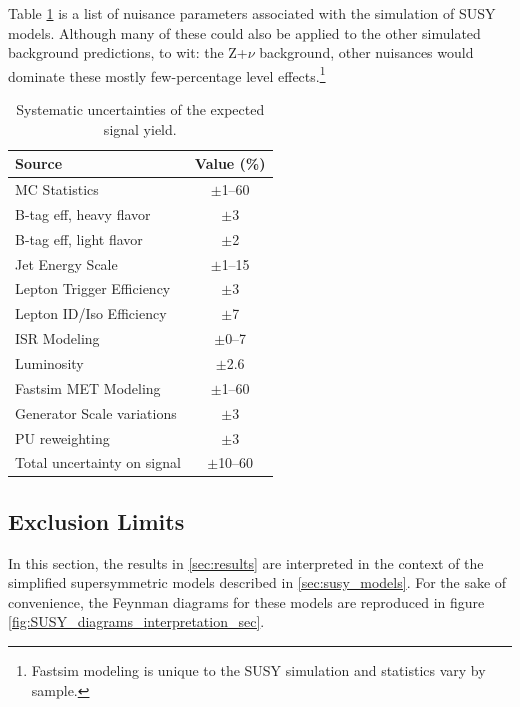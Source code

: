     Table \ref{tab:syst} is a list of nuisance parameters associated with the simulation of SUSY models. Although many of these could also be applied to the other simulated background predictions, to wit: the Z+$\nu$ background, other nuisances would dominate these mostly few-percentage level effects.\footnote{Fastsim \MET modeling is unique to the SUSY simulation and statistics vary by sample.} 

    \begin{table}[htb]
      \begin{center}
        \footnotesize
        \caption{\label{tab:syst} Systematic uncertainties of the expected signal yield. }
        \begin{tabular}{l|c}
          \hline
          \hline
          Source                     & Value (\%) \\
          \hline
          MC Statistics              & $\pm$1--60 \\
          B-tag eff, heavy flavor    & $\pm$3    \\
          B-tag eff, light flavor    & $\pm$2    \\
          Jet Energy Scale           & $\pm$1--15  \\
          Lepton Trigger Efficiency  & $\pm$3    \\
          Lepton ID/Iso Efficiency   & $\pm$7    \\
          ISR Modeling               & $\pm$0--7  \\
          Luminosity                 & $\pm$2.6  \\
          Fastsim MET Modeling       & $\pm$1--60    \\
          Generator Scale variations & $\pm$3   \\
          PU reweighting             & $\pm$3    \\
          \hline
          Total uncertainty on signal& $\pm$10--60 \\
          \hline
          \hline
        \end{tabular}
      \end{center}
    \end{table}

  \subsection{Exclusion Limits}

    In this section, the results in \ref{sec:results} are interpreted in the context of the simplified supersymmetric models described in \ref{sec:susy_models}. For the sake of convenience, the Feynman diagrams for these models are reproduced in figure \ref{fig:SUSY_diagrams_interpretation_sec}.

